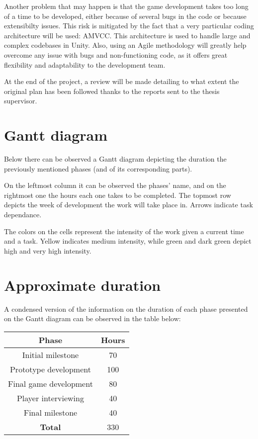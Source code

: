 Another problem that may happen is that the game development takes too long
of a time to be developed, either because of several bugs in the code or because
extensibilty issues. This risk is mitigated by the fact that a very particular
coding architecture will be used: \gls{AMVCC}. This architecture is used
to handle large and complex codebases in Unity. Also, using an Agile methodology
will greatly help overcome any issue with bugs and non-functioning code, as
it offers great flexibility and adaptability to the development team.

At the end of the project, a review will be made detailing to what extent the original plan has been followed thanks to the reports sent to the thesis supervisor.

\section{Gantt diagram}

Below there can be observed a Gantt diagram depicting the duration the previously mentioned phases (and of its corresponding parts).

On the leftmost column it can be observed the phases' name, and on the rightmost one the hours each one takes to be completed. The topmost row depicts the week of development the work will take place in. Arrows indicate task dependance.

The colors on the cells represent the intensity of the work given a current time and a task. Yellow indicates medium intensity, while green and dark green depict high and very high intensity.


\section{Approximate duration}

A condensed version of the information on the duration of each phase presented on the Gantt diagram can be observed in the table below:

\begin{center}
    \begin{tabular}{ |c|c| } 
        \hline
        \textbf{Phase} & \textbf{Hours} \\
        \hline
        \hline
        Initial milestone & 70 \\ 
        \hline
        Prototype development & 100 \\ 
        \hline
        Final game development & 80 \\ 
        \hline
        Player interviewing & 40 \\ 
        \hline
        Final milestone & 40 \\ 
        \hline
        \hline
        \textbf{Total} & 330 \\ 
        \hline
    \end{tabular}
\end{center}

